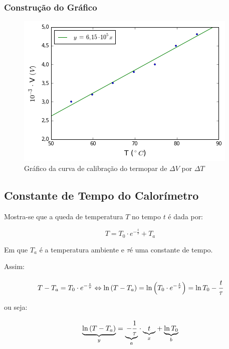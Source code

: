 \documentclass[a4paper]{article}
\begin{document}
			\subsubsection{Construção do Gráfico}

			\begin{figure}[!ht]
					\begin{centering}
						\includegraphics[scale=0.745]{exp06a-parte1.png}
					\par\end{centering}
				\caption{Gráfico da curva de calibração do termopar de $\Delta V$ por $\Delta T$}
			\end{figure}

	\subsection{Constante de Tempo do Calorímetro}
	    	Mostra-se que a queda de temperatura $T$ no tempo $t$ é dada por:
	    
	    	\begin{equation}
	    	{\displaystyle T=T_{0}\cdot e^{-\frac{t}{\tau}}+T_{a}}
	    	\end{equation}
	    
	    
	    	Em que $T_{a}$ é a temperatura ambiente e $\tau$é uma constante
	    	de tempo.
	    
	    	Assim:
	    
	    	\begin{equation}
	    		T-T_{a}=T_{0}\cdot e^{-\frac{t}{\tau}}\Leftrightarrow\ln\left(T-T_{a}\right)=\ln\left(T_{0}\cdot e^{-\frac{t}{\tau}}\right)=\ln T_{0}-\cfrac{t}{\tau}
	    	\end{equation}
	    
	    
	    	ou seja:
	    
	    	\begin{equation}
	    		\underset{y}{\underbrace{\ln\left(T-T_{a}\right)}}=\underset{a}{\underbrace{-\cfrac{1}{\tau}}}\cdot\underset{x}{\underbrace{t}}+\underset{b}{\underbrace{\ln T_{0}}}
	    	\end{equation}
	    
\end{document}
